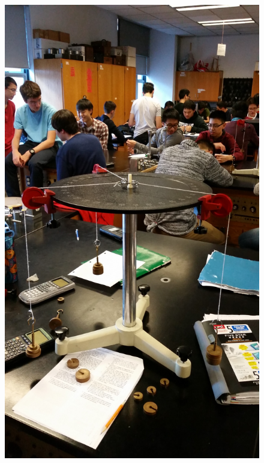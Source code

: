 \documentclass[11pt, titlepage]{article}
\begin{document}
\begin{figure}[p]
\centering
\hspace*{-10.5cm}
\includegraphics[scale=0.15, angle=270]{lab3.jpg}
\vspace*{17cm}
\end{figure}
\end{document}
